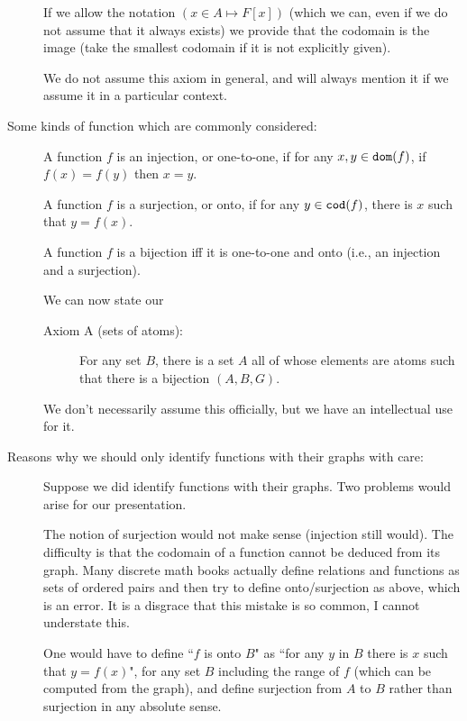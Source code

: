 \documentclass[12pt]{article}
\begin{document}
\begin{description}
If we allow the notation $(x \in A \mapsto F[x])$ (which we can, even if we do not assume that it always exists) we provide that the codomain is the image (take the smallest codomain if it is not explicitly given).

We do not assume this axiom in general, and will always mention it if we assume it in a particular context.

\item[Some kinds of function which are commonly considered:]

A function $f$ is an injection, or one-to-one, if for any $x,y \in {\tt dom}(f)$, if $f(x)=f(y)$ then $x=y$.

A function $f$ is a surjection, or onto, if for any $y \in {\tt cod}(f)$, there is $x$ such that $y = f(x)$.

A function $f$ is a bijection iff it is one-to-one and onto (i.e., an injection and a surjection).

We can now state our

\begin{description}

\item[Axiom A (sets of atoms):]  For any set $B$, there is a set $A$ all of whose elements are atoms such
that there is a bijection $(A,B,G)$.

\end{description}

We don't necessarily assume this officially, but we have an intellectual use for it.

\item[Reasons why we should only identify functions with their graphs with care:]

Suppose we did identify functions with their graphs.  Two problems would arise for our presentation.

The notion of surjection would not make sense (injection still would).  The difficulty is that
the codomain of a function cannot be deduced from its graph.  Many discrete math books actually
define relations and functions as sets of ordered pairs and then try to define onto/surjection as above, which is an error.  It is a disgrace that this mistake is so common, I cannot understate this.

One would have to define ``$f$ is onto $B$" as ``for any $y$ in $B$ there is $x$ such that $y=f(x)$", for any set
$B$ including the range of $f$ (which can be computed from the graph), and define surjection from $A$ to $B$ rather than surjection in any absolute sense.


\end{description}
\end{document}
